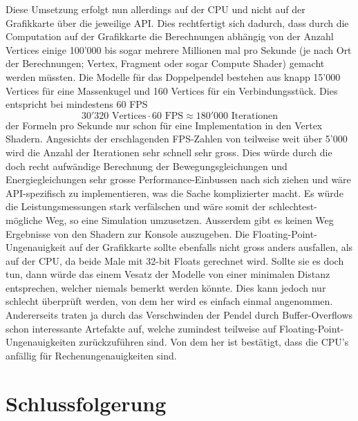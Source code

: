 \documentclass[titlepage, 11pt, a4paper, ngerman]{article}
\begin{document}
Diese Umsetzung erfolgt nun allerdings auf der \acrshort{CPU} und nicht auf der Grafikkarte über die jeweilige \acrshort{API}. Dies rechtfertigt sich dadurch, dass durch die Computation auf der Grafikkarte die Berechnungen abhängig von der Anzahl Vertices einige 100'000 bis sogar mehrere Millionen mal pro Sekunde (je nach Ort der Berechnungen; \gls{Vertex}, \gls{Fragment} oder sogar Compute \gls{Shader}) gemacht werden müssten. Die Modelle für das Doppelpendel bestehen aus knapp 15'000 Vertices für eine Massenkugel und 160 Vertices für ein Verbindungsstück. Dies entspricht bei mindestens 60 \acrfull{FPS} $$30'320 \text{ Vertices} \cdot 60 \text{ FPS} \approx 180'000 \text{ Iterationen}$$ der Formeln pro Sekunde nur schon für eine Implementation in den Vertex \gls{Shader}n. Angesichts der erschlagenden \acrshort{FPS}-Zahlen von teilweise weit über 5'000 wird die Anzahl der Iterationen sehr schnell sehr gross. Dies würde durch die doch recht aufwändige Berechnung der Bewegungsgleichungen und Energiegleichungen sehr grosse Performance-Einbussen nach sich ziehen und wäre \acrshort{API}-spezifisch zu implementieren, was die Sache komplizierter macht. Es würde die Leistungsmessungen stark verfälschen und wäre somit der schlechtest-mögliche Weg, so eine Simulation umzusetzen. Ausserdem gibt es keinen Weg Ergebnisse von den \gls{Shader}n zur Konsole auszugeben. Die \gls{Floating-Point}-Ungenauigkeit auf der Grafikkarte sollte ebenfalls nicht gross anders ausfallen, als auf der \acrshort{CPU}, da beide Male mit 32-bit \glspl{Float} gerechnet wird. Sollte sie es doch tun, dann würde das einem Vesatz der Modelle von einer minimalen Distanz entsprechen, welcher niemals bemerkt werden könnte. Dies kann jedoch nur schlecht überprüft werden, von dem her wird es einfach einmal angenommen. Andererseits traten ja durch das Verschwinden der Pendel durch Buffer-Overflows schon interessante Artefakte auf, welche zumindest teilweise auf \gls{Floating-Point}-Ungenauigkeiten zurückzuführen sind. Von dem her ist bestätigt, dass die \acrshort{CPU}'s anfällig für Rechenungenauigkeiten sind.


\newpage
\section{Schlussfolgerung}
\end{document}
